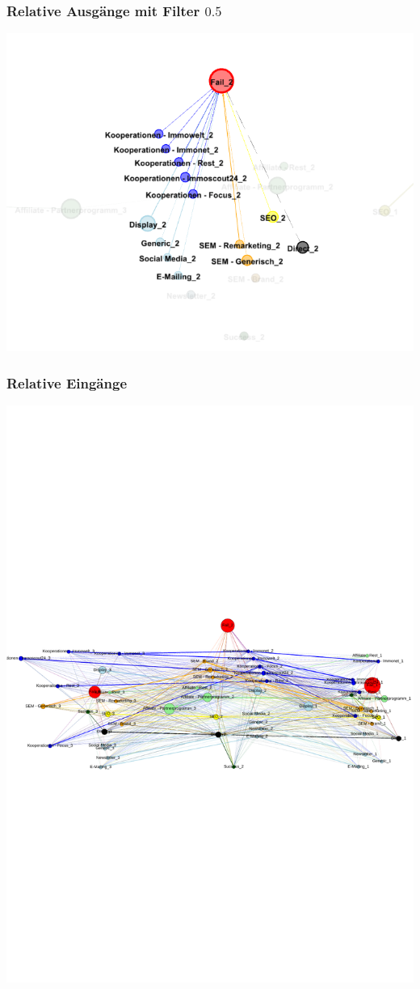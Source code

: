 \begin{frame}\frametitle{Relative Ausgänge mit Filter $0.5$}
	\centering\includegraphics[scale=0.3]{out_filter_50_fail.png}
\end{frame}

\begin{frame}\frametitle{Relative Eingänge}
	\centering\includegraphics[scale=0.3]{in_labels.pdf}
\end{frame}

